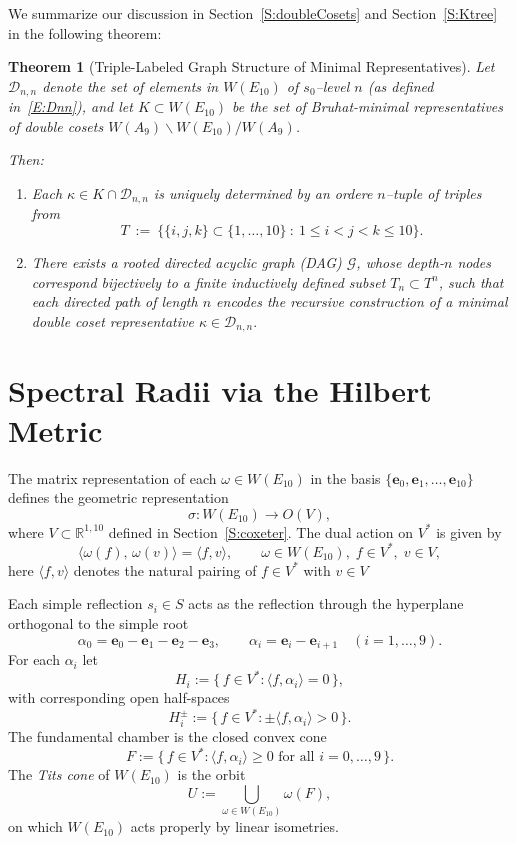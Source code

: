 \documentclass[11pt]{amsart}
\numberwithin{equation}{section}
\newtheorem{thm}{Theorem}[section]
\newcommand{\vve}{\mathbf{e}}
\begin{document}
We summarize our discussion in Section~\ref{S:doubleCosets} and Section~\ref{S:Ktree} in the following theorem:

\begin{thm}[Triple-Labeled Graph Structure of Minimal Representatives]\label{T:TripleGraph}
Let $\mathcal{D}_{n,n}$ denote the set of elements in $W(E_{10})$ of $s_0$--level $n$ (as defined in~\eqref{E:Dnn}), and let $K \subset W(E_{10})$ be the set of Bruhat-minimal representatives of double cosets \(W(A_9)\backslash W(E_{10})/W(A_9)\).

Then:
\begin{enumerate}
\item Each $\kappa \in K \cap \mathcal{D}_{n,n}$ is uniquely determined by an ordere $n$--tuple of triples from
 \[T\ :=\ \{\{i,j,k\} \subset \{1,\dots, 10\} \ :\ 1\le i<j<k \le 10\}.\]
\item There exists a rooted directed acyclic graph (DAG) $\mathcal{G}$, whose depth-$n$ nodes correspond bijectively to a finite inductively defined subset $T_n \subset T^n$, such that each directed path of length $n$ encodes the recursive construction of a minimal double coset representative $\kappa \in \mathcal{D}_{n,n}.$
\end{enumerate}
\end{thm}
 




\section{Spectral Radii via the Hilbert Metric}\label{S:Hilbert}

The matrix representation of each $\omega \in W(E_{10})$ in the basis 
$\{\vve_0,\vve_1,\dots,\vve_{10}\}$ defines the geometric representation
\[
\sigma: W(E_{10}) \longrightarrow O(V),
\]
where $V\subset \mathbb{R}^{1,10}$ defined in Section~\ref{S:coxeter}.
The dual action on $V^*$ is given by
\[
\langle \omega(f),\, \omega(v)\rangle = \langle f, v\rangle,
\qquad 
\omega\in W(E_{10}),\; f\in V^*,\; v\in V,
\]
here $\langle f,v\rangle$ denotes the natural pairing of $f\in V^*$ with $v\in V$

Each simple reflection $s_i\in S$ acts as the reflection through the
hyperplane orthogonal to the simple root
\[
\alpha_0 = \vve_0 - \vve_1 - \vve_2 - \vve_3, 
\qquad
\alpha_i = \vve_i - \vve_{i+1} \quad (i=1,\dots,9).
\]
For each $\alpha_i$ let
\[
H_i := \{\,f\in V^* : \langle f,\alpha_i\rangle = 0\,\},
\]
with corresponding open half-spaces
\[
H_i^{\pm} := \{\,f\in V^* : \pm\langle f,\alpha_i\rangle > 0\,\}.
\]
The fundamental chamber is the closed convex cone
\[
F := \{\,f\in V^* : \langle f,\alpha_i\rangle \ge 0
\text{ for all } i=0,\dots,9\,\}.
\]
The \emph{Tits cone} of $W(E_{10})$ is the orbit
\[
U := \bigcup_{\omega\in W(E_{10})} \omega(F),
\]
on which $W(E_{10})$ acts properly by linear isometries.
\end{document}
